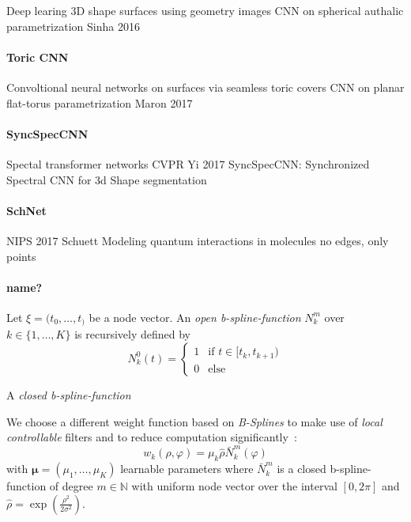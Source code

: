 \documentclass[pdftex,10pt,a4paper]{scrartcl}
\begin{document}
Deep learing 3D shape surfaces using geometry images
CNN on spherical authalic parametrization
Sinha 2016

\paragraph{Toric CNN}

Convoltional neural networks on surfaces via seamless toric covers
CNN on planar flat-torus parametrization
Maron 2017

\paragraph{SyncSpecCNN}

Spectal transformer networks
CVPR
Yi 2017
SyncSpecCNN: Synchronized Spectral CNN for 3d Shape segmentation

\paragraph{SchNet}

NIPS 2017
Schuett
Modeling quantum interactions in molecules
no edges, only points

\paragraph{name?}

Let $\xi = (t_0, \ldots, t_)$ be a node vector.
An \emph{open b-spline-function} $N_k^m$ over $k \in \{ 1, \ldots, K \}$ is recursively defined by
\begin{equation*}
  N_k^0(t) = \begin{cases}
    1 & \text{if } t \in [t_k, t_{k+1})\\
    0 & \text{else}
  \end{cases}
\end{equation*}

A \emph{closed b-spline-function}

We choose a different weight function based on \emph{B-Splines} to make use of \emph{local controllable} filters and to reduce computation significantly~\cite{Fey2017}:
\begin{equation*}
  w_k(\rho, \varphi) = \mu_k \hat{\rho} \bar{N}_k^m(\varphi)
\end{equation*}
with $\boldsymbol{\mu} = (\mu_1, \ldots, \mu_K )$ learnable parameters where $\bar{N}_k^m$ is a closed b-spline-function of degree $m \in \mathbb{N}$ with uniform node vector over the interval $[0, 2\pi]$ and $\hat{\rho} = \exp(\frac{\rho^2}{2\sigma^2})$.
\end{document}
